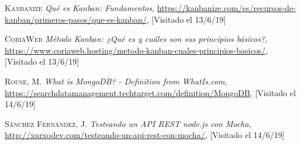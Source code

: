 \documentclass[spanish,12pt, a4paper, twoside]{paper}
\begin{document}
\begin{thebibliography}{00}
 \textsc{Kanbanize} \textit{Qué es Kanban: Fundamentos}, \url{https://kanbanize.com/es/recursos-de-kanban/primeros-pasos/que-es-kanban/}, [Visitado el 13/6/19]

 \textsc{CoriaWeb} \textit{Método Kanban: ¿Qué es y cuáles son sus principios básicos?}, \url{https://www.coriaweb.hosting/metodo-kanban-cuales-principios-basicos/}, [Visitado el 13/6/19]

 \textsc{Rouse, M.} \textit{What is MongoDB? - Definition from WhatIs.com}, \url{https://searchdatamanagement.techtarget.com/definition/MongoDB}, [Visitado el 14/6/19]

 \textsc{Sánchez Fernández, J.} \textit{Testeando un API REST node.js con Mocha}, \url{http://xurxodev.com/testeando-un-api-rest-con-mocha/}, [Visitado el 14/6/19]
\end{thebibliography}
\endgroup
\end{document}
